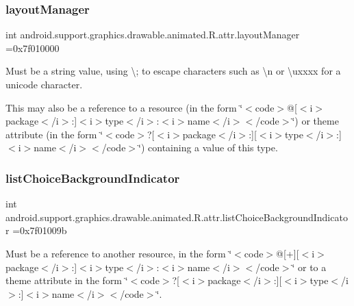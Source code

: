 \subsubsection{\texorpdfstring{layout\+Manager}{layoutManager}}
{\footnotesize\ttfamily int android.\+support.\+graphics.\+drawable.\+animated.\+R.\+attr.\+layout\+Manager =0x7f010000\hspace{0.3cm}{\ttfamily [static]}}

Must be a string value, using \textquotesingle{}\textbackslash{};\textquotesingle{} to escape characters such as \textquotesingle{}\textbackslash{}n\textquotesingle{} or \textquotesingle{}\textbackslash{}uxxxx\textquotesingle{} for a unicode character. 

This may also be a reference to a resource (in the form \char`\"{}$<$code$>$@\mbox{[}$<$i$>$package$<$/i$>$\+:\mbox{]}$<$i$>$type$<$/i$>$\+:$<$i$>$name$<$/i$>$$<$/code$>$\char`\"{}) or theme attribute (in the form \char`\"{}$<$code$>$?\mbox{[}$<$i$>$package$<$/i$>$\+:\mbox{]}\mbox{[}$<$i$>$type$<$/i$>$\+:\mbox{]}$<$i$>$name$<$/i$>$$<$/code$>$\char`\"{}) containing a value of this type. \mbox{\label{classandroid_1_1support_1_1graphics_1_1drawable_1_1animated_1_1R_1_1attr_a850023a1ef98980f4fee11d4be91241e}} 
\subsubsection{\texorpdfstring{list\+Choice\+Background\+Indicator}{listChoiceBackgroundIndicator}}
{\footnotesize\ttfamily int android.\+support.\+graphics.\+drawable.\+animated.\+R.\+attr.\+list\+Choice\+Background\+Indicator =0x7f01009b\hspace{0.3cm}{\ttfamily [static]}}

Must be a reference to another resource, in the form \char`\"{}$<$code$>$@\mbox{[}+\mbox{]}\mbox{[}$<$i$>$package$<$/i$>$\+:\mbox{]}$<$i$>$type$<$/i$>$\+:$<$i$>$name$<$/i$>$$<$/code$>$\char`\"{} or to a theme attribute in the form \char`\"{}$<$code$>$?\mbox{[}$<$i$>$package$<$/i$>$\+:\mbox{]}\mbox{[}$<$i$>$type$<$/i$>$\+:\mbox{]}$<$i$>$name$<$/i$>$$<$/code$>$\char`\"{}. \mbox{\label{classandroid_1_1support_1_1graphics_1_1drawable_1_1animated_1_1R_1_1attr_a9df9b037df3119731ea35fa5ae3e736f}} 
